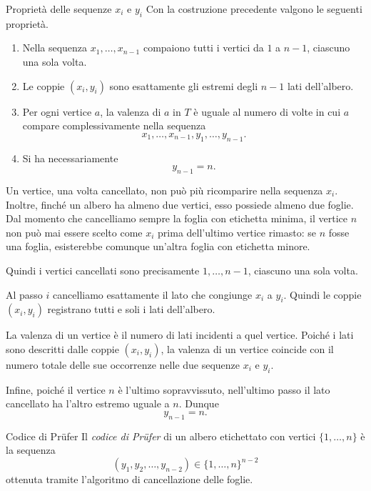 \documentclass[a4paper]{article}
\begin{document}
\begin{snippetproposition}{Proprietà delle sequenze \(x_i\) e \(y_i\)}
    Con la costruzione precedente valgono le seguenti proprietà.
    \begin{enumerate}
        \item Nella sequenza \(x_1,\ldots,x_{n-1}\) compaiono tutti i vertici da \(1\) a \(n-1\), ciascuno una sola volta.
        \item Le coppie \((x_i,y_i)\) sono esattamente gli estremi degli \(n-1\) lati dell'albero.
        \item Per ogni vertice \(a\), la valenza di \(a\) in \(T\) è uguale al numero di volte in cui \(a\) compare complessivamente nella sequenza
        \[
            x_1,\ldots,x_{n-1},y_1,\ldots,y_{n-1}.
        \]
        \item Si ha necessariamente
        \[
            y_{n-1}=n.
        \]
    \end{enumerate}
\end{snippetproposition}

\begin{snippetproof}{}
    Un vertice, una volta cancellato, non può più ricomparire nella sequenza \(x_i\). Inoltre, finché un albero ha almeno due vertici, esso possiede almeno due foglie. Dal momento che cancelliamo sempre la foglia con etichetta minima, il vertice \(n\) non può mai essere scelto come \(x_i\) prima dell'ultimo vertice rimasto: se \(n\) fosse una foglia, esisterebbe comunque un'altra foglia con etichetta minore.

    Quindi i vertici cancellati sono precisamente \(1,\ldots,n-1\), ciascuno una sola volta.

    Al passo \(i\) cancelliamo esattamente il lato che congiunge \(x_i\) a \(y_i\). Quindi le coppie \((x_i,y_i)\) registrano tutti e soli i lati dell'albero.

    La valenza di un vertice è il numero di lati incidenti a quel vertice. Poiché i lati sono descritti dalle coppie \((x_i,y_i)\), la valenza di un vertice coincide con il numero totale delle sue occorrenze nelle due sequenze \(x_i\) e \(y_i\).

    Infine, poiché il vertice \(n\) è l'ultimo sopravvissuto, nell'ultimo passo il lato cancellato ha l'altro estremo uguale a \(n\). Dunque
    \[
        y_{n-1}=n.
    \]
\end{snippetproof}

\begin{snippetdefinition}{Codice di Prüfer}
    Il \emph{codice di Prüfer} di un albero etichettato con vertici \(\{1,\ldots,n\}\) è la sequenza
    \[
        (y_1,y_2,\ldots,y_{n-2})\in \{1,\ldots,n\}^{n-2}
    \]
    ottenuta tramite l'algoritmo di cancellazione delle foglie.
\end{snippetdefinition}
\end{document}
